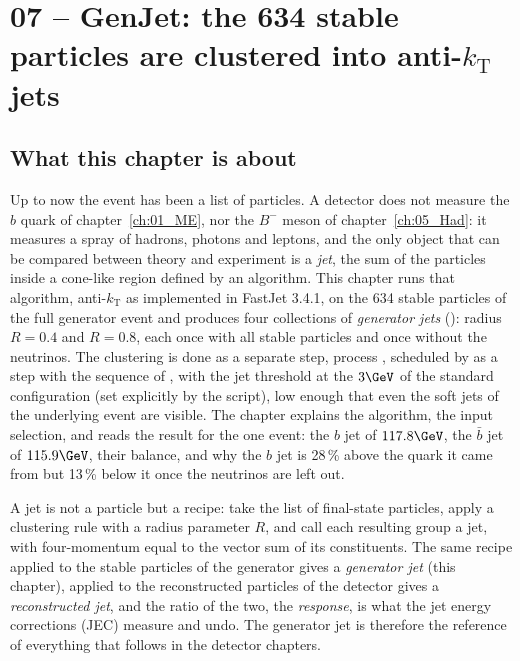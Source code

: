 \providecommand{\antikt}{anti-$k_{\mathrm{T}}$}
\providecommand{\dR}{\ensuremath{\Delta R}}

\chapter{07 -- GenJet: the 634 stable particles are clustered into \antikt{} jets}
\label{ch:07_GenJet}

\section{What this chapter is about}

Up to now the event has been a list of particles. A detector does not measure the $b$ quark of
chapter~\ref{ch:01_ME}, nor the $B^-$ meson of chapter~\ref{ch:05_Had}: it measures a spray of hadrons,
photons and leptons, and the only object that can be compared between theory and experiment is a
\emph{jet}, the sum of the particles inside a cone-like region defined by an algorithm. This chapter runs
that algorithm, \antikt{} as implemented in FastJet 3.4.1, on the 634 stable particles of the full generator
event and produces four collections of \emph{generator jets} (): radius $R=0.4$ and
$R=0.8$, each once with all stable particles and once without the neutrinos. The clustering is done as a
separate  step, process , scheduled by  as a  step
with the sequence  of , with the jet
\pt{} threshold at the $3\GeV$ of the standard configuration (set explicitly by the script), low enough that
even the soft jets of the underlying event are visible.
The chapter explains the algorithm, the input selection, and reads the result for the one event: the $b$ jet
of $117.8\GeV$, the $\bar b$ jet of $115.9\GeV$, their balance, and why the $b$ jet is 28\,\% above
the quark it came from but 13\,\% below it once the neutrinos are left out.

\begin{plainwords}[A jet]
A jet is not a particle but a recipe: take the list of final-state particles, apply a clustering rule with a
radius parameter $R$, and call each resulting group a jet, with four-momentum equal to the vector sum of its
constituents. The same recipe applied to the stable particles of the generator gives a \emph{generator jet}
(this chapter), applied to the reconstructed particles of the detector gives a \emph{reconstructed jet}, and
the ratio of the two, the \emph{response}, is what the jet energy corrections (JEC) measure and undo. The
generator jet is therefore the reference of everything that follows in the detector chapters.
\end{plainwords}

